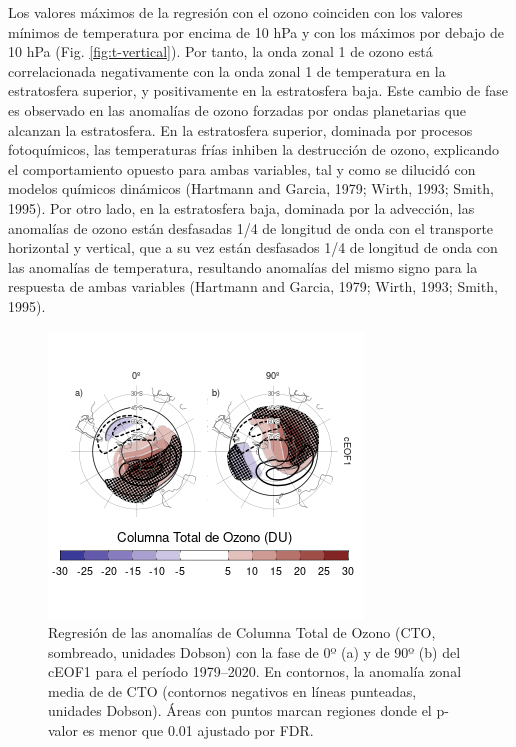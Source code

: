 \documentclass[12pt,oneside]{reedthesis}
\begin{document}
Los valores máximos de la regresión con el ozono coinciden con los valores mínimos de temperatura por encima de 10 hPa y con los máximos por debajo de 10 hPa (Fig. \ref{fig:t-vertical}).
Por tanto, la onda zonal 1 de ozono está correlacionada negativamente con la onda zonal 1 de temperatura en la estratosfera superior, y positivamente en la estratosfera baja.
Este cambio de fase es observado en las anomalías de ozono forzadas por ondas planetarias que alcanzan la estratosfera.
En la estratosfera superior, dominada por procesos fotoquímicos, las temperaturas frías inhiben la destrucción de ozono, explicando el comportamiento opuesto para ambas variables, tal y como se dilucidó con modelos químicos dinámicos (Hartmann and Garcia, 1979; Wirth, 1993; Smith, 1995).
Por otro lado, en la estratosfera baja, dominada por la advección, las anomalías de ozono están desfasadas 1/4 de longitud de onda con el transporte horizontal y vertical, que a su vez están desfasados 1/4 de longitud de onda con las anomalías de temperatura, resultando anomalías del mismo signo para la respuesta de ambas variables (Hartmann and Garcia, 1979; Wirth, 1993; Smith, 1995).



\begin{figure}
\includegraphics{figures/20-ceofs/o3-regr-1} \caption{Regresión de las anomalías de Columna Total de Ozono (CTO, sombreado, unidades Dobson) con la fase de 0º (a) y de 90º (b) del cEOF1 para el período 1979--2020. En contornos, la anomalía zonal media de de CTO (contornos negativos en líneas punteadas, unidades Dobson). Áreas con puntos marcan regiones donde el p-valor es menor que 0.01 ajustado por FDR.}\label{fig:o3-regr}
\end{figure}
\end{document}
